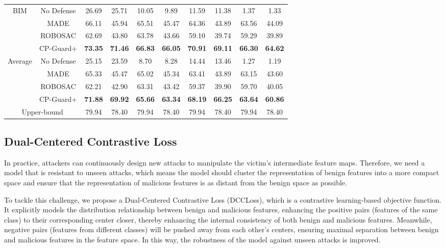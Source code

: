 \begin{table*}[t]
{\begin{tabular}{c|c|cc|cc|cc|cc}
        \multirow{4}{*}{BIM } 
        & No Defense & 26.69 & 25.71 & 10.05 & 9.89 & 11.59 & 11.38 & 1.37 & 1.33 \\ 
        & MADE & 66.11 & 45.94 & 65.51 & 45.47 &  64.36 & 43.89  & 63.56 & 44.09 \\ 
        & ROBOSAC & 62.69 & 43.80  & 63.78 & 43.66 & 59.10 & 39.74  & 59.29 & 39.89 \\ 
        & CP-Guard+ & \textbf{73.35} & \textbf{71.46} & \textbf{66.83} & \textbf{66.05} & \textbf{70.91} & \textbf{69.11}  & \textbf{66.30} & \textbf{64.62} \\ 
        \midrule

        \multirow{4}{*}{Average} 
        & No Defense & 25.15 & 23.59 & 8.70 & 8.28 & 14.44 & 13.46 & 1.27 & 1.19 \\ 
        & MADE & 65.33 & 45.47 & 65.02 & 45.34 & 63.41 & 43.89 & 63.15 & 43.60 \\ 
        & ROBOSAC & 62.21 & 42.90 & 63.31 & 43.42 & 59.37 & 39.90 & 59.70 & 40.05 \\ 
        & CP-Guard+ & \textbf{71.88} & \textbf{69.92} & \textbf{65.66} & \textbf{63.34} & \textbf{68.19} & \textbf{66.25} & \textbf{63.64} & \textbf{60.86}\\ 
        \midrule
        \multicolumn{2}{c|}{Upper-bound} & 79.94 & 78.40& 79.94 & 78.40 & 79.94 & 78.40 & 79.94 & 78.40 \\ 
        \bottomrule
    \end{tabular}
    }
    \vspace{-5mm}
\end{table*}


\subsection{Dual-Centered Contrastive Loss}

In practice, attackers can continuously design new attacks to manipulate the victim's intermediate feature maps. Therefore, we need a model that is resistant to unseen attacks, which means the model should cluster the representation of benign features into a more compact space and ensure that the representation of malicious features is as distant from the benign space as possible.

To tackle this challenge, we propose a Dual-Centered Contrastive Loss (DCCLoss), which is a contrastive learning-based objective function. It explicitly models the distribution relationship between benign and malicious features, enhancing the positive pairs (features of the same class) to their corresponding center closer, thereby enhancing the internal consistency of both benign and malicious features. Meanwhile, negative pairs (features from different classes) will be pushed away from each other's centers, ensuring maximal separation between benign and malicious features in the feature space. In this way, the robustness of the model against unseen attacks is improved.

